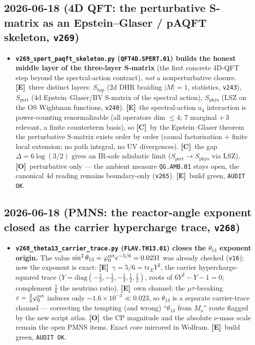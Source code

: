 \documentclass[11pt]{article}
\providecommand{\mE}{\textbf{[E]}}\providecommand{\mC}{\textbf{[C]}}
\providecommand{\mO}{\textbf{[O]}}\providecommand{\mX}{\textbf{[X]}}
\providecommand{\vref}[1]{\texttt{#1}}
\begin{document}
\subsection*{2026-06-18 (4D QFT: the perturbative S-matrix as an Epstein--Glaser / pAQFT skeleton, \texttt{v269})}
\begin{itemize}
\item \textbf{\texttt{v269\_spert\_paqft\_skeleton.py} (\texttt{QFT4D.SPERT.01}) builds the honest middle
  layer of the three-layer S-matrix} (the first concrete 4D-QFT step beyond the spectral-action contract),
  \emph{not} a nonperturbative closure. \mE\ three distinct layers: $S_{\mathrm{top}}$ (2d DHR braiding
  $|M|{=}1$, statistics, \vref{v243}), $S_{\mathrm{pert}}$ (4d Epstein--Glaser/BV S-matrix of the spectral
  action), $S_{\mathrm{phys}}$ (LSZ on the OS Wightman functions, \vref{v240}). \mE\ the spectral-action
  $a_4$ interaction is power-counting renormalizable (all operators dim $\le4$; $7$ marginal $+\,3$ relevant,
  a finite counterterm basis), so \mC\ by the Epstein--Glaser theorem the perturbative S-matrix exists order
  by order (causal factorisation $+$ finite local extension; no path integral, no UV divergences). \mC\ the
  gap $\Delta=6\log(3/2)$ gives an IR-safe adiabatic limit ($S_{\mathrm{pert}}\to S_{\mathrm{phys}}$ via LSZ).
  \mO\ perturbative only --- the ambient measure \texttt{QG.AMB.01} stays open, the canonical 4d reading
  remains boundary-only (\vref{v265}). \mE\ build green, \texttt{AUDIT OK}.
\end{itemize}

\subsection*{2026-06-18 (PMNS: the reactor-angle exponent closed as the carrier hypercharge trace, \texttt{v268})}
\begin{itemize}
\item \textbf{\texttt{v268\_theta13\_carrier\_trace.py} (\texttt{FLAV.TH13.01}) closes the $\theta_{13}$
  exponent origin.} The value $\sin^2\theta_{13}=\varphi_0^{\mathrm{ret}} e^{-5/6}=0.0231$ was already checked (\vref{v16}); now
  the exponent is exact: \mE\ $\gamma=5/6=\mathrm{tr}_E Y^2$, the carrier hypercharge-squared trace
  ($Y=\mathrm{diag}(-\tfrac13,-\tfrac13,-\tfrac13,\tfrac12,\tfrac12)$, roots of $6Y^2-Y-1=0$; complement
  $\tfrac16$ the neutrino ratio). \mE\ own channel: the $\mu\tau$-breaking $\varepsilon=\tfrac34\varphi_0^{\mathrm{ret}}$
  induces only ${\sim}1.6\times10^{-3}\ll0.023$, so $\theta_{13}$ is a separate carrier-trace channel ---
  correcting the tempting (and wrong) ``$\theta_{13}$ from $M_\nu$'' route flagged by the new script atlas.
  \mO\ the CP magnitude and the absolute $\nu$-mass scale remain the open PMNS items. Exact core mirrored in
  Wolfram. \mE\ build green, \texttt{AUDIT OK}.
\end{itemize}
\end{document}
